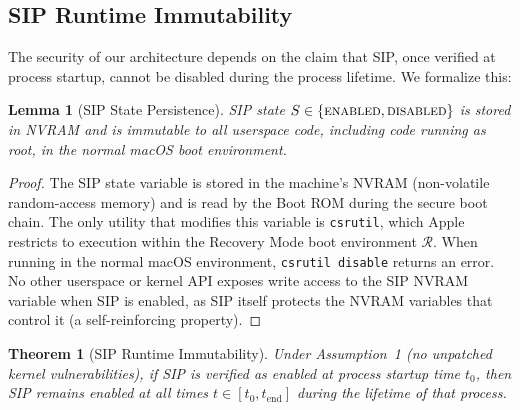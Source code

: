 \documentclass[10pt,twocolumn,letterpaper]{article}
\newtheorem{theorem}{Theorem}
\newtheorem{lemma}{Lemma}
\begin{document}
\subsection{SIP Runtime Immutability}

The security of our architecture depends on the claim that SIP, once verified at process startup, cannot be disabled during the process lifetime. We formalize this:

\begin{lemma}[SIP State Persistence]
\label{lem:sip-nvram}
SIP state $S \in \{\textsc{enabled}, \textsc{disabled}\}$ is stored in NVRAM and is immutable to all userspace code, including code running as root, in the normal macOS boot environment.
\end{lemma}

\begin{proof}
The SIP state variable is stored in the machine's NVRAM (non-volatile random-access memory) and is read by the Boot ROM during the secure boot chain. The only utility that modifies this variable is \texttt{csrutil}, which Apple restricts to execution within the Recovery Mode boot environment $\mathcal{R}$. When running in the normal macOS environment, \texttt{csrutil disable} returns an error. No other userspace or kernel API exposes write access to the SIP NVRAM variable when SIP is enabled, as SIP itself protects the NVRAM variables that control it (a self-reinforcing property).
\end{proof}

\begin{theorem}[SIP Runtime Immutability]
\label{thm:sip}
Under Assumption~1 (no unpatched kernel vulnerabilities), if SIP is verified as enabled at process startup time $t_0$, then SIP remains enabled at all times $t \in [t_0, t_{\text{end}}]$ during the lifetime of that process.
\end{theorem}
\end{document}
